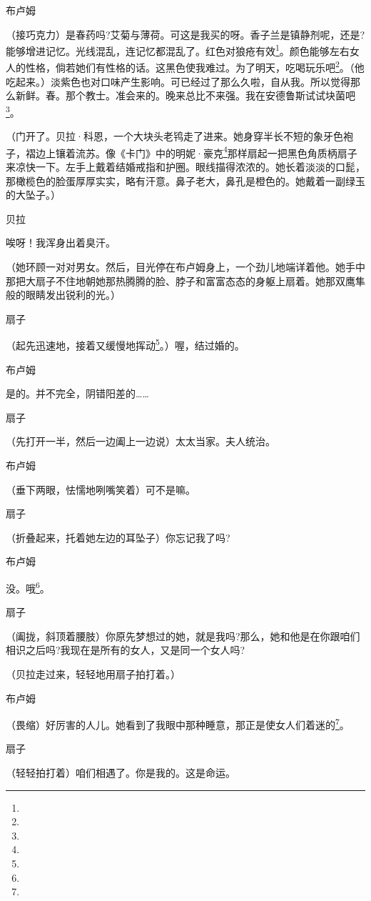 \par 布卢姆
\par （接巧克力）是春药吗?艾菊与薄荷。可这是我买的呀。香子兰是镇静剂呢，还是?能够增进记忆。光线混乱，连记忆都混乱了。红色对狼疮有效\footnote{}。颜色能够左右女人的性格，倘若她们有性格的话。这黑色使我难过。为了明天，吃喝玩乐吧\footnote{}。（他吃起来。）淡紫色也对口味产生影响。可已经过了那么久啦，自从我。所以觉得那么新鲜。春。那个教士。准会来的。晚来总比不来强。我在安德鲁斯试试块菌吧\footnote{}。
\par （门开了。贝拉·科恩，一个大块头老鸨走了进来。她身穿半长不短的象牙色袍子，褶边上镶着流苏。像《卡门》中的明妮·豪克\footnote{}那样扇起一把黑色角质柄扇子来凉快一下。左手上戴着结婚戒指和护圈。眼线描得浓浓的。她长着淡淡的口髭，那橄榄色的脸蛋厚厚实实，略有汗意。鼻子老大，鼻孔是橙色的。她戴着一副绿玉的大坠子。）
\par 贝拉
\par 唉呀！我浑身出着臭汗。
\par （她环顾一对对男女。然后，目光停在布卢姆身上，一个劲儿地端详着他。她手中那把大扇子不住地朝她那热腾腾的脸、脖子和富富态态的身躯上扇着。她那双鹰隼般的眼睛发出锐利的光。）
\par 扇子
\par （起先迅速地，接着又缓慢地挥动\footnote{}。）喔，结过婚的。
\par 布卢姆
\par 是的。并不完全，阴错阳差的……
\par 扇子
\par （先打开一半，然后一边阖上一边说）太太当家。夫人统治。
\par 布卢姆
\par （垂下两眼，怯懦地咧嘴笑着）可不是嘛。
\par 扇子
\par （折叠起来，托着她左边的耳坠子）你忘记我了吗?
\par 布卢姆
\par 没。哦\footnote{}。
\par 扇子
\par （阖拢，斜顶着腰肢）你原先梦想过的她，就是我吗?那么，她和他是在你跟咱们相识之后吗?我现在是所有的女人，又是同一个女人吗?
\par （贝拉走过来，轻轻地用扇子拍打着。）
\par 布卢姆
\par （畏缩）好厉害的人儿。她看到了我眼中那种睡意，那正是使女人们着迷的\footnote{}。
\par 扇子
\par （轻轻拍打着）咱们相遇了。你是我的。这是命运。
